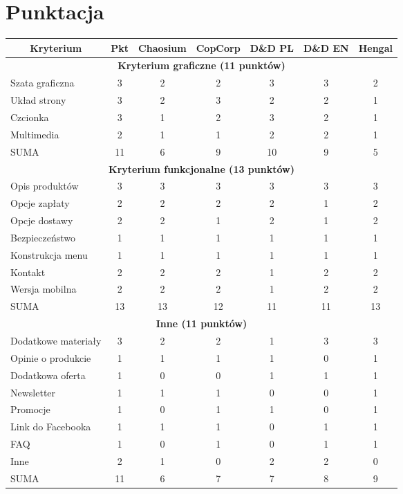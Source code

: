 \documentclass[a4paper,11pt]{article}
\begin{document}
\newpage

\section {Punktacja}

\begin{tabular}{|l|c||c|c|c|c|c|}
	\hline
	
	\multicolumn{1}{|c}{\textbf{Kryterium}} & \multicolumn{1}{|c||}{\textbf{Pkt}} & \multicolumn{1}{c}{\textbf{Chaosium}} & \multicolumn{1}{|c}{\textbf{CopCorp}} & \multicolumn{1}{|c}{\textbf{D\&D PL}} &\multicolumn{1}{|c}{\textbf{D\&D EN}} &\multicolumn{1}{|c|}{\textbf{Hengal}}\\
	\hline \hline
	
	\multicolumn{7}{|c|}{\textbf{Kryterium graficzne (11 punktów)}} \\
	\hline
	Szata graficzna & 3 & 2 & 2 & 3 & 3 & 2 \\
	\hline
	Układ strony & 3 & 2 & 3 & 2 & 2 & 1 \\ 
	\hline
	Czcionka & 3 & 1 & 2 & 3 & 2 & 1 \\ 
	\hline
	Multimedia & 2 & 1 & 1 & 2 & 2 & 1 \\ 
	\hline \hline
	SUMA & 11 & 6 & 9 & 10 & 9 & 5 \\ 
	\hline \hline

	\multicolumn{7}{|c|}{\textbf{Kryterium funkcjonalne (13 punktów)}} \\
	\hline
	Opis produktów & 3 & 3 & 3 & 3 & 3 & 3 \\ 
	\hline
	Opcje zapłaty & 2 & 2 & 2 & 2 & 1 & 2 \\ 
	\hline
	Opcje dostawy & 2 & 2 & 1 & 2 & 1 & 2 \\ 
	\hline
	Bezpieczeństwo & 1 & 1 & 1 & 1 & 1 & 1 \\ 
	\hline
	Konstrukcja menu & 1 & 1 & 1 & 1 & 1 & 1 \\ 
	\hline
	Kontakt & 2 & 2 & 2 & 1 & 2 & 2 \\ 
	\hline
	Wersja mobilna & 2 & 2 & 2 & 1 & 2 & 2 \\ 
	\hline \hline
	SUMA & 13 & 13 & 12 & 11 & 11 & 13 \\ 
	\hline \hline
	
	\multicolumn{7}{|c|}{\textbf{Inne (11 punktów)}} \\
	\hline
	Dodatkowe materiały & 3 & 2 & 2 & 1 & 3 & 3 \\ 
	\hline
	Opinie o produkcie & 1 & 1 & 1 & 1 & 0 & 1 \\ 
	\hline
	Dodatkowa oferta & 1 & 0 & 0 & 1 & 1 & 1 \\ 
	\hline
	Newsletter & 1 & 1 & 1 & 0 & 0 & 1 \\ 
	\hline
	Promocje & 1 & 0 & 1 & 1 & 0 & 1 \\ 
	\hline
	Link do Facebooka & 1 & 1 & 1 & 0 & 1 & 1 \\ 
	\hline
	FAQ & 1 & 0 & 1 & 0 & 1 & 1 \\ 
	\hline
	Inne & 2 & 1 & 0 & 2 & 2 & 0 \\ 
	\hline \hline
	SUMA & 11 & 6 & 7 & 7 & 8 & 9 \\ 
	\hline \hline
	

\end{tabular}
\end{document}
